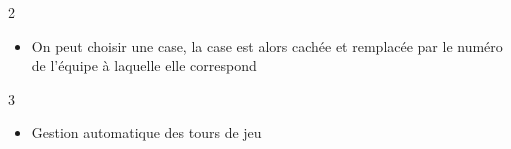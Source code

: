 \begin{UPSTICahierDesCharges}{2}
\begin{itemize}
  \item On peut choisir une case, la case est alors cachée et remplacée par le numéro de l'équipe à laquelle elle correspond
\end{itemize}
\end{UPSTICahierDesCharges}

\begin{UPSTICahierDesCharges}{3}
\begin{itemize}
  \item Gestion automatique des tours de jeu
\end{itemize}
\end{UPSTICahierDesCharges}
